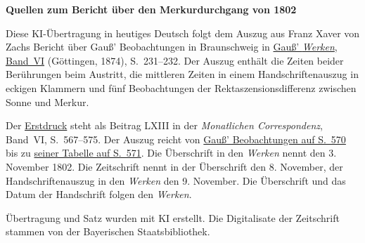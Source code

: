 \clearpage\thispagestyle{empty}
\begin{center}\textbf{Quellen zum Bericht über den Merkurdurchgang von 1802}\end{center}
\noindent Diese KI-Übertragung in heutiges Deutsch folgt dem Auszug aus Franz Xaver von Zachs Bericht über Gauß’ Beobachtungen in Braunschweig in \href{https://gdz.sub.uni-goettingen.de/id/PPN236007467}{Gauß’ \textit{Werken}, Band~VI} (Göttingen, 1874), S.~231--232. Der Auszug enthält die Zeiten beider Berührungen beim Austritt, die mittleren Zeiten in einem Handschriftenauszug in eckigen Klammern und fünf Beobachtungen der Rektaszensionsdifferenz zwischen Sonne und Merkur.
\par\smallskip\noindent Der \href{https://api.digitale-sammlungen.de/iiif/image/v2/bsb10538598_00581/full/1450,/0/default.jpg}{Erstdruck} steht als Beitrag LXIII in der \textit{Monatlichen Correspondenz}, Band~VI, S.~567--575. Der Auszug reicht von \href{https://api.digitale-sammlungen.de/iiif/image/v2/bsb10538598_00584/full/1450,/0/default.jpg}{Gauß’ Beobachtungen auf S.~570} bis zu \href{https://api.digitale-sammlungen.de/iiif/image/v2/bsb10538598_00585/full/1450,/0/default.jpg}{seiner Tabelle auf S.~571}. Die Überschrift in den \textit{Werken} nennt den 3. November 1802. Die Zeitschrift nennt in der Überschrift den 8. November, der Handschriftenauszug in den \textit{Werken} den 9. November. Die Überschrift und das Datum der Handschrift folgen den \textit{Werken}.
\par\smallskip\noindent Übertragung und Satz wurden mit KI erstellt. Die Digitalisate der Zeitschrift stammen von der Bayerischen Staatsbibliothek.
\clearpage
